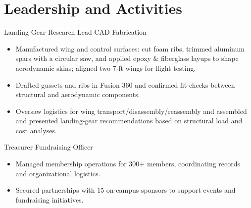 \section{Leadership and Activities}

Landing Gear Research Lead \textbar{} CAD \textbar{} Fabrication
\begin{itemize}
  \item Manufactured wing and control surfaces: cut foam ribs, trimmed aluminum spars with a circular saw, and applied epoxy \& fiberglass layups to shape aerodynamic skins; aligned two 7-ft wings for flight testing.
  \item Drafted gussets and ribs in Fusion 360 and confirmed fit-checks between structural and aerodynamic components.
  \item Oversaw logistics for wing transport/disassembly/reassembly and assembled and presented landing-gear recommendations based on structural load and cost analyses.
\end{itemize}
\entrygap

Treasurer \textbar{} Fundraising Officer
\begin{itemize}
  \item Managed membership operations for 300+ members, coordinating records and organizational logistics.
  \item Secured partnerships with 15 on-campus sponsors to support events and fundraising initiatives.
\end{itemize}


